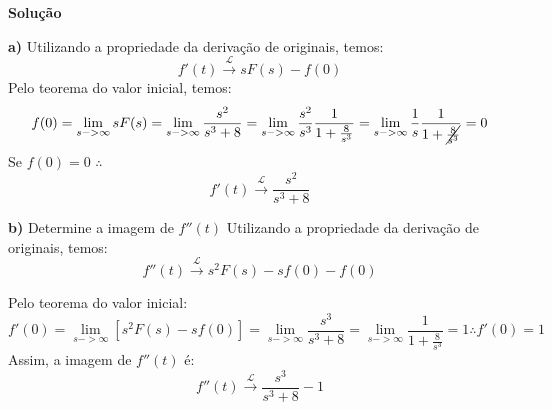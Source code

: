\linespread{1.5}

\textbf{Solução}

\textbf{a)}
Utilizando a propriedade da derivação de originais, temos:
\begin{equation*}
    f'(t) \xrightarrow{\mathcal{L}} sF(s) - f(0)
\end{equation*}
Pelo teorema do valor inicial, temos:
\begin{equation*}
    f(0) = \lim_{s->\infty} sF(s) = \lim_{s->\infty} \frac{s^2}{s^3+8} = \lim_{s->\infty} \frac{s^2}{s^3}\frac{1}{1+\frac{8}{s^3}}=\lim_{s->\infty} \frac{1}{s}\frac{1}{1+\cancel{\frac{8}{s^3}}} = 0
\end{equation*}
Se $f(0) = 0$ $\therefore$ 
\begin{equation*}
    \boxed{f'(t) \xrightarrow{\mathcal{L}}\frac{s^2}{s^3+8}}
\end{equation*}

\textbf{b)} Determine a imagem de $f''(t)$
Utilizando a propriedade da derivação de originais, temos:
\begin{equation*}
    f''(t) \xrightarrow{\mathcal{L}} s^2F(s) - sf(0) - f(0)
\end{equation*}

Pelo teorema do valor inicial:
\begin{equation*}
    f'(0) = \lim_{s->\infty} [s^2F(s) - sf(0)] = \lim_{s->\infty} \frac{s^3}{s^3+8} = \lim_{s->\infty} \frac{1}{1+\frac{8}{s^3}} = 1 \therefore f'(0) = 1
\end{equation*}
Assim, a imagem de $f''(t) $ é: 
\begin{equation*}
    \boxed{f''(t) \xrightarrow{\mathcal{L}} \frac{s^3}{s^3 + 8} - 1}
\end{equation*}